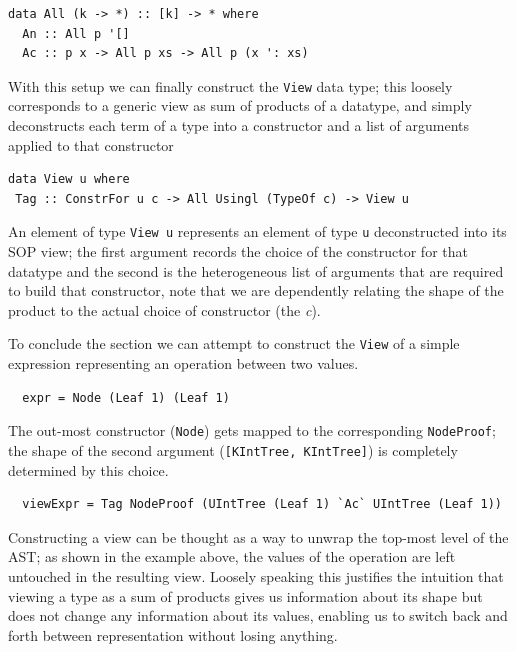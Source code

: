 \documentclass[11pt, titlepage]{article}
\newcommand{\toHaskell}[1]{\texttt{#1}\xspace}
\begin{document}
\begin{verbatim}
data All (k -> *) :: [k] -> * where
  An :: All p '[]
  Ac :: p x -> All p xs -> All p (x ': xs)
\end{verbatim}

With this setup we can finally construct the \texttt{View} data type;
this loosely corresponds to a generic view as sum of products of a
datatype, and simply deconstructs each term of a type into a constructor
and a list of arguments applied to that constructor

\begin{verbatim}
data View u where
 Tag :: ConstrFor u c -> All Usingl (TypeOf c) -> View u
\end{verbatim}

An element of type \texttt{View u} represents an element of type \texttt{u} 
deconstructed into its SOP view; the first argument records the choice 
of the constructor for that datatype and the second is the heterogeneous list of 
arguments that are required to build that constructor, note that we are 
dependently relating the shape of the product to the actual choice of 
constructor (the \emph{c}).

To conclude the section we can attempt to construct the \texttt{View} of a 
simple expression representing an operation between two values.

\begin{verbatim}
  expr = Node (Leaf 1) (Leaf 1)
\end{verbatim}

The out-most constructor (\texttt{Node}) gets mapped to the corresponding \texttt{NodeProof}; the shape of the second 
argument (\toHaskell{[KIntTree, KIntTree]}) is completely determined by 
this choice.

\begin{verbatim}
  viewExpr = Tag NodeProof (UIntTree (Leaf 1) `Ac` UIntTree (Leaf 1))
\end{verbatim}

Constructing a view can be thought as a way to unwrap the top-most level of the 
AST; as shown in the example above, the values of the operation are left untouched in 
the resulting view. Loosely speaking this justifies the intuition that 
viewing a type as a sum of products gives us information about its shape but 
does not change any information about its values, enabling us to switch back and 
forth between representation without losing anything.
\end{document}
